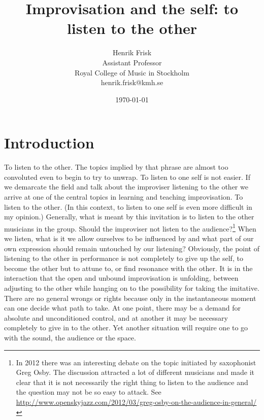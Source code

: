 \documentclass[a4paper]{article}
\title{Improvisation and the self: to listen to the other}
\author{Henrik Frisk\\{\small Assistant Professor}\\{\small Royal College of Music in Stockholm}\\{\small henrik.frisk@kmh.se}}
\date{\today}
\begin{document}
\maketitle

\thispagestyle{empty}

\section*{Introduction}


To listen to the other. The topics implied by that phrase are almost too convoluted even to begin to try to unwrap. To listen to one self is not easier. If we demarcate the field and talk about the improviser listening to the other we arrive at one of the central topics in learning and teaching improvisation. To listen to the other. (In this context, to listen to one self is even more difficult in my opinion.) Generally, what is meant by this invitation is to listen to the other musicians in the group. Should the improviser not listen to the audience?\footnote{In 2012 there was an interesting debate on the topic initiated by saxophonist Greg Osby. The discussion attracted a lot of different musicians and made it clear that it is not necessarily the right thing to listen to the audience and the question may not be so easy to attack. See \url{http://www.openskyjazz.com/2012/03/greg-osby-on-the-audience-in-general/}} When we listen, what is it we allow ourselves to be influenced by and what part of our own expression should remain untouched by our listening? Obviously, the point of listening to the other in performance is not completely to give up the self, to become the other but to attune to, or find resonance with the other. It is in the interaction that the open and unbound improvisation is unfolding, between adjusting to the other while hanging on to the possibility for taking the imitative. There are no general wrongs or rights because only in the instantaneous moment can one decide what path to take. At one point, there may be a demand for absolute and unconditioned control, and at another it may be necessary completely to give in to the other. Yet another situation will require one to go with the sound, the audience or the space. 
\end{document}
